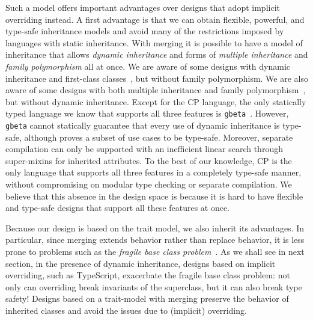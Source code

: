 Such a model offers important advantages over designs that adopt implicit
overriding instead. A first advantage is that we can obtain flexible, powerful,
and type-safe inheritance models and avoid many of the restrictions imposed by
languages with static inheritance.  With merging it is possible to have a model
of inheritance that allows \emph{dynamic inheritance} and forms of
\emph{multiple inheritance} and \emph{family polymorphism} all at once. We are
aware of some designs with dynamic inheritance and first-class
classes~\citep{takikawa2012gradual,lee2015theory}, but without family
polymorphism.  We are also aware of some designs with both multiple inheritance
and family polymorphism~\citep{nystrom2006j,aracic2006overview,clarke2007tribe},
but without dynamic inheritance. Except for the CP language, the only statically
typed language we know that supports all three features is
\texttt{gbeta}~\citep{ernst2000gbeta}. However, \texttt{gbeta} cannot statically
guarantee that every use of dynamic inheritance is type-safe, although
\citet{ernst2002safe} proves a subset of use cases to be type-safe. Moreover,
separate compilation can only be supported with an inefficient linear search
through super-mixins for inherited attributes. To the best of our knowledge, CP
is the only language that supports all three features in a completely type-safe
manner, without compromising on modular type checking or separate compilation.
We believe that this absence in the design space is because it is hard to have
flexible and type-safe designs that support all these features at once.

Because our design is based on the trait model, we also inherit its advantages.
In particular, since merging extends behavior rather than replace behavior, it
is less prone to problems such as the \emph{fragile base class
problem}~\citep{mikhajlov1998study}. As we shall see in next section, in the
presence of dynamic inheritance, designs based on implicit overriding, such as
TypeScript, exacerbate the fragile base class problem: not only can overriding
break invariants of the superclass, but it can also break type safety! Designs
based on a trait-model with merging preserve the behavior of inherited classes
and avoid the issues due to (implicit) overriding.
